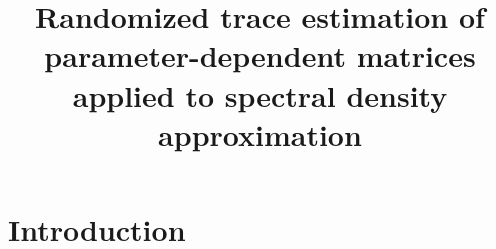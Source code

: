 \documentclass[12pt]{article}
\title{Randomized trace estimation of parameter-dependent matrices applied to spectral density approximation}
\begin{document}
\maketitle


\todo{
    \tableofcontents
}

\begin{abstract}
\end{abstract}


\section{Introduction}
\label{sec:introduction}
\end{document}

